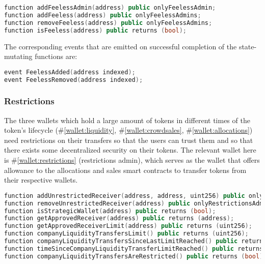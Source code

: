 \documentclass[a4paper,12pt]{article}
\begin{document}
\begin{lstlisting}[language=C++, caption=Solidity feeless functions.]
function addFeelessAdmin(address) public onlyFeelessAdmin;
function addFeeless(address) public onlyFeelessAdmins;
function removeFeeless(address) public onlyFeelessAdmins;
function isFeeless(address) public returns (bool);
\end{lstlisting}
The corresponding events that are emitted on successful completion of the state-mutating functions are:
\begin{lstlisting}[language=C++, caption=Solidity feeless events.]
event FeelessAdded(address indexed);
event FeelessRemoved(address indexed);
\end{lstlisting}

\subsubsection{Restrictions}

The three wallets which hold a large amount of tokens in different times of the token's lifecycle (\#\ref{wallet:liquidity}, \#\ref{wallet:crowdsales}, \#\ref{wallet:allocations}) need restrictions on their transfers so that the users can trust them and so that there exists some decentralized security on their tokens.
The relevant wallet here is \#\ref{wallet:restrictions} (restrictions admin), which serves as the wallet that offers allowance to the allocations and sales smart contracts to transfer tokens from their respective wallets.
\begin{lstlisting}[language=C++, caption=Solidity strategic wallets restriction functions.]
function addUnrestrictedReceiver(address, address, uint256) public onlyRestrictionsAdmin;
function removeUnrestrictedReceiver(address) public onlyRestrictionsAdmin;
function isStrategicWallet(address) public returns (bool);
function getApprovedReceiver(address) public returns (address);
function getApprovedReceiverLimit(address) public returns (uint256);
function companyLiquidityTransfersLimit() public returns (uint256);
function companyLiquidityTransfersSinceLastLimitReached() public returns (uint256);
function timeSinceCompanyLiquidityTransferLimitReached() public returns (uint256);
function companyLiquidityTransfersAreRestricted() public returns (bool);
\end{lstlisting}
\end{document}
